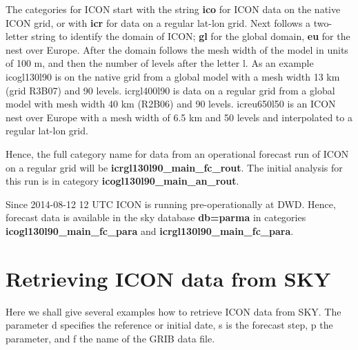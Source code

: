 The categories for ICON start with the string \textbf{ico} for ICON data on the native
ICON grid, or with \textbf{icr} for data on a regular lat-lon grid.
Next follows a two-letter string to identify the domain of ICON; \textbf{gl} for the
global domain, \textbf{eu} for the nest over Europe. After the domain follows the
mesh width of the model in units of 100 m, and then the number of levels after the
letter l. As an example icogl130l90 is on the native grid from a global model with a mesh width
13 km (grid R3B07) and 90 levels. icrgl400l90 is data on a regular grid from a global model with
mesh width 40 km (R2B06) and 90 levels. icreu650l50 is an ICON nest over Europe with a
mesh width of 6.5 km and 50 levels and interpolated to a regular lat-lon grid.

Hence, the full category name for data from an operational forecast run of ICON on a
regular grid will be \textbf{icrgl130l90\_main\_fc\_rout}. The initial analysis for this
run is in category \textbf{icogl130l90\_main\_an\_rout}.

Since 2014-08-12 12 UTC ICON is running pre-operationally at DWD. Hence, forecast data
is available in the sky database \textbf{db=parma} in categories
\textbf{icogl130l90\_main\_fc\_para} and \textbf{icrgl130l90\_main\_fc\_para}.

\section{Retrieving ICON data from SKY}

Here we shall give several examples how to retrieve ICON data from SKY.
The parameter d specifies the reference or initial date, s is the forecast step, p the parameter,
and f the name of the GRIB data file.

